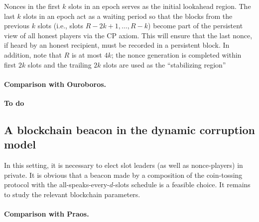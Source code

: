 \begin{remark}
Nonces in the first $k$ slots in an epoch serves as the initial lookahead region. 
The last $k$ slots in an epoch act as a waiting period so that 
the blocks from the previous $k$ slots (i.e., slots $R - 2k+1, \ldots, R-k$) 
become part of the persistent view of all honest players via the CP axiom. 
This will ensure that the last nonce, if heard by an honest recipient, 
must be recorded in a persistent block. 
In addition, note that $R$ is at most $4k$; 
the nonce generation is completed within first $2k$ slots
and the trailing $2k$ slots are used as the ``stabilizing region''
\end{remark}

\paragraph{Comparison with Ouroboros.}
\textbf{To do}




\subsection{A blockchain beacon in the dynamic corruption model}
In this setting, it is necessary to elect slot leaders (as well as nonce-players) in private. 
It is obvious that a beacon made by a composition of the coin-tossing protocol 
with the all-speaks-every-$d$-slots schedule is a feasible choice. 
It remains to study the relevant blockchain parameters.

\paragraph{Comparison with Praos.}



